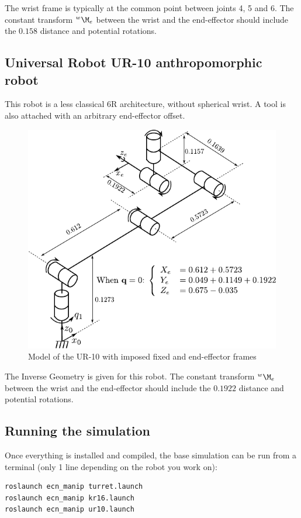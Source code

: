 \documentclass{ecnreport}
\begin{document}
The wrist frame is typically at the common point between joints 4, 5 and 6.
The constant transform $\wMe$ between the wrist and the end-effector should include the $0.158$ distance and potential rotations.

\subsection{Universal Robot UR-10 anthropomorphic robot}

This robot is a less classical 6R architecture, without spherical wrist. A tool is also attached with an arbitrary end-effector offset.

\begin{figure}[h!]\centering
	\includegraphics[width=.6\linewidth]{fig/ur10}
	\caption{Model of the UR-10 with imposed fixed and end-effector frames}
\end{figure}

The Inverse Geometry is given for this robot. 
The constant transform $\wMe$ between the wrist and the end-effector should include the $0.1922$ distance and potential rotations.


\newpage
\subsection{Running the simulation}

Once everything is installed and compiled, the base simulation can be run from a terminal (only 1 line depending on the robot you work on):
\cppstyle
\begin{lstlisting}
roslaunch ecn_manip turret.launch
roslaunch ecn_manip kr16.launch
roslaunch ecn_manip ur10.launch
\end{lstlisting}
\end{document}

